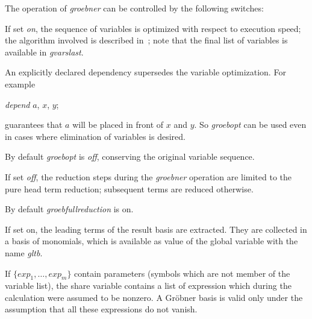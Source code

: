 The operation of \emph{groebner} can be controlled by the following switches:
\begin{description}
\item[groebopt --] If set \emph{on}, the sequence of variables is optimized
with respect to execution speed; the algorithm involved is described
in~\cite{Boege:86}; note that the final list of variables is available in
\emph{gvarslast}.

An explicitly declared dependency supersedes the variable optimization. For example
\begin{center}
{\it depend} $a$, $x$, $y$;
\end{center}
guarantees that $a$ will be placed in front of $x$ and $y$. So
\emph{groebopt} can be used even in cases where elimination of variables is desired.

By default \emph{groebopt} is \emph{off}, conserving the original variable sequence.

\item[\emph{groebfullreduction} --] If set \emph{off}, the reduction steps during
the \linebreak[4] \emph{groebner} operation are limited to the pure head
term reduction; subsequent terms are reduced otherwise.

By default \emph{groebfullreduction} is on.

\item[\emph{gltbasis} --] If set on, the leading terms of the result basis are
extracted. They are collected in a basis of monomials, which is
available as value of the global variable with the name \emph{gltb}.

\item[\emph{glterms} --] If $\{exp_1, \ldots , exp_m\} $ contain parameters
(symbols which are not member of the variable list), the share variable
 contains a list of expression which during the
calculation were assumed to be nonzero. A Gr\"obner basis
is valid only under the assumption that all these expressions do not vanish.

\end{description}

